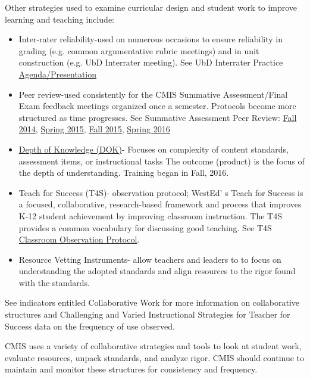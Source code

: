 \documentclass{report}
\begin{document}
\begin{findings}
Other strategies used to examine curricular design and student work to improve learning and teaching include:
\begin{itemize}
\item Inter-rater reliability-used on numerous occasions to ensure reliability in grading (e.g. common argumentative rubric meetings) and in unit construction (e.g. UbD Interrater meeting). See UbD Interrater Practice \href{https://docs.google.com/presentation/d/18f8rB_VHa8vQhp-cbmgXFCCJEZ0QB3QkEIp2BiChwyM/edit#slide=id.gd6a9d401a_3_0}{Agenda/Presentation} 
\item Peer review-used consistently for the CMIS Summative Assessment/Final Exam feedback meetings organized once a semester. Protocols become more structured as time progresses. See Summative Assessment Peer Review: \href{https://drive.google.com/a/cmis.ac.th/folderview?id=0ByVFfrm0zfolTHY0dmtURG5pcGs&usp=sharing}{Fall 2014}, \href{https://drive.google.com/a/cmis.ac.th/folderview?id=0ByVFfrm0zfolaWQzeWxCTlVyUFU&usp=sharing}{Spring 2015}, \href{https://drive.google.com/a/cmis.ac.th/folderview?id=0ByVFfrm0zfolRjQzTDhmT0dyYzg&usp=sharing}{Fall 2015}, \href{https://drive.google.com/a/cmis.ac.th/folderview?id=0ByVFfrm0zfolT29vQXpQeXp3VlU&usp=sharing}{Spring 2016} 
\item \href{https://docs.google.com/a/cmis.ac.th/presentation/d/1GDBfSgHVsW5KKXvlBzm-JipLzBO_tWI0R1TlEOwIZ88/edit?usp=sharing}{Depth of Knowledge (DOK)}- Focuses on complexity of content standards, assessment items, or instructional tasks The outcome (product) is the focus of the depth of understanding. Training began in Fall, 2016. 
\item Teach for Success (T4S)- observation protocol; WestEd' s Teach for Success is a focused, collaborative, research-based framework and process that improves K-12 student achievement by improving classroom instruction. The T4S provides a common vocabulary for discussing good teaching. See T4S \href{https://docs.google.com/a/cmis.ac.th/spreadsheets/d/1ACz3l3DPUgIqRhmZ1LWk9RwVBjo0iLsbJAupJoic5Dg/edit?usp=sharing}{Classroom Observation Protocol}.
\item Resource Vetting Instruments- allow teachers and leaders to to focus on understanding the adopted standards and align resources to the rigor found with the standards. 
\end{itemize}
See indicators entitled Collaborative Work for more information on collaborative structures and Challenging and Varied Instructional Strategies for Teacher for Success data on the frequency of use observed.   


CMIS  uses a variety of collaborative strategies and tools to look at student work, evaluate resources, unpack standards, and analyze rigor. CMIS should continue to maintain and monitor these structures for consistency and frequency. 
\end{findings}
\end{document}

